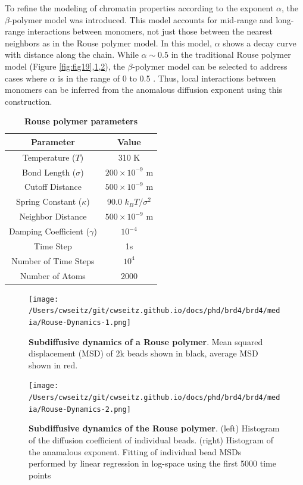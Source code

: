 To refine the modeling of chromatin properties according to the exponent $\alpha$, the $\beta$-polymer model was introduced. This model accounts for mid-range and long-range interactions between monomers, not just those between the nearest neighbors as in the Rouse polymer model. In this model, $\alpha$ shows a decay curve with distance along the chain. While $\alpha \sim 0.5$ in the traditional Rouse polymer model (Figure \ref{fig:fig19},\ref{fig:fig20},\ref{fig:fig21}), the $\beta$-polymer model can be selected to address cases where $\alpha$ is in the range of 0 to 0.5 \parencite{Amitai2013,Amitai2017,Hajjoul2013}. Thus, local interactions between monomers can be inferred from the anomalous diffusion exponent using this construction.

\begin{table}[h!]
\centering
\begin{tabular}{|c|c|}
\hline
\textbf{Parameter} & \textbf{Value} \\ \hline
Temperature ($T$) & 310 K \\ \hline
Bond Length ($\sigma$) & $200 \times 10^{-9}$ m \\ \hline
Cutoff Distance & $500 \times 10^{-9}$ m \\ \hline
Spring Constant ($\kappa$) & 90.0 $k_{B}T/\sigma^2$ \\ \hline
Neighbor Distance & $500 \times 10^{-9}$ m \\ \hline
Damping Coefficient ($\gamma$) & $10^{-4}$ \\ \hline
Time Step & 1s\\ \hline
Number of Time Steps & $10^4$ \\ \hline
Number of Atoms & 2000 \\ \hline
\end{tabular}
\caption{\textbf{Rouse polymer parameters}}
\end{table}

\begin{figure}[t]
\centering
\texttt{[image: /Users/cwseitz/git/cwseitz.github.io/docs/phd/brd4/brd4/media/Rouse-Dynamics-1.png]}
\caption{\textbf{Subdiffusive dynamics of a Rouse polymer}.  Mean squared displacement (MSD) of 2k beads shown in black, average MSD shown in red.}
\label{fig:fig20}
\end{figure}

\begin{figure}[th]
\centering
\texttt{[image: /Users/cwseitz/git/cwseitz.github.io/docs/phd/brd4/brd4/media/Rouse-Dynamics-2.png]}
\caption{\textbf{Subdiffusive dynamics of the Rouse polymer}. (left) Histogram of the diffusion coefficient of individual beads. (right) Histogram of the anamalous exponent. Fitting of individual bead MSDs performed by linear regression in log-space using the first 5000 time points}
\label{fig:fig21}
\end{figure}

